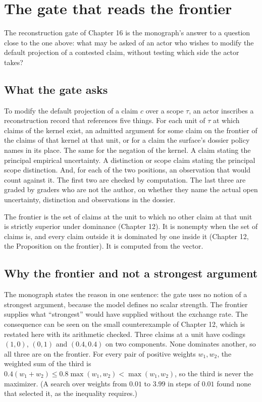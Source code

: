 \documentclass[11pt]{article}
\begin{document}
\section{The gate that reads the frontier}\label{sec:gate}

The reconstruction gate of Chapter 16 is the monograph's answer to a question close to the one above: what may be asked of an actor who wishes to modify the default projection of a contested claim, without testing which side the actor takes?

\subsection{What the gate asks}

To modify the default projection of a claim $c$ over a scope $\tau$, an actor inscribes a reconstruction record that references five things. For each unit of $\tau$ at which claims of the kernel exist, an admitted argument for some claim on the frontier of the claims of that kernel at that unit, or for a claim the surface's dossier policy names in its place. The same for the negation of the kernel. A claim stating the principal empirical uncertainty. A distinction or scope claim stating the principal scope distinction. And, for each of the two positions, an observation that would count against it. The first two are checked by computation. The last three are graded by graders who are not the author, on whether they name the actual open uncertainty, distinction and observations in the dossier.

The frontier is the set of claims at the unit to which no other claim at that unit is strictly superior under dominance (Chapter 12). It is nonempty when the set of claims is, and every claim outside it is dominated by one inside it (Chapter 12, the Proposition on the frontier). It is computed from the vector.

\subsection{Why the frontier and not a strongest argument}

The monograph states the reason in one sentence: the gate uses no notion of a strongest argument, because the model defines no scalar strength. The frontier supplies what ``strongest'' would have supplied without the exchange rate. The consequence can be seen on the small counterexample of Chapter 12, which is restated here with its arithmetic checked. Three claims at a unit have codings $(1,0)$, $(0,1)$ and $(0.4,0.4)$ on two components. None dominates another, so all three are on the frontier. For every pair of positive weights $w_1,w_2$, the weighted sum of the third is $0.4(w_1+w_2)\le0.8\max(w_1,w_2)<\max(w_1,w_2)$, so the third is never the maximizer. (A search over weights from $0.01$ to $3.99$ in steps of $0.01$ found none that selected it, as the inequality requires.)
\end{document}

